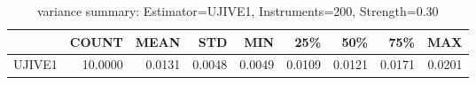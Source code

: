\begin{table}[ht]
\centering
\caption{variance summary: Estimator=UJIVE1, Instruments=200, Strength=0.30}
\begin{tabular}{lrrrrrrrr}
\toprule
 & COUNT & MEAN & STD & MIN & 25\% & 50\% & 75\% & MAX \\
\midrule
UJIVE1 & 10.0000 & 0.0131 & 0.0048 & 0.0049 & 0.0109 & 0.0121 & 0.0171 & 0.0201 \\
\bottomrule
\end{tabular}
\end{table}
